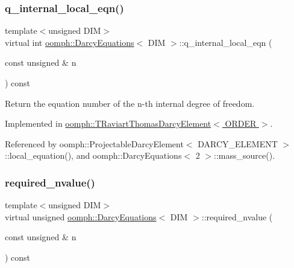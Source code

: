 \subsubsection{\texorpdfstring{q\+\_\+internal\+\_\+local\+\_\+eqn()}{q\_internal\_local\_eqn()}}
{\footnotesize\ttfamily template$<$unsigned D\+IM$>$ \\
virtual int \hyperlink{classoomph_1_1DarcyEquations}{oomph\+::\+Darcy\+Equations}$<$ D\+IM $>$\+::q\+\_\+internal\+\_\+local\+\_\+eqn (\begin{DoxyParamCaption}\item[{const unsigned \&}]{n }\end{DoxyParamCaption}) const\hspace{0.3cm}{\ttfamily [pure virtual]}}



Return the equation number of the n-\/th internal degree of freedom. 



Implemented in \hyperlink{classoomph_1_1TRaviartThomasDarcyElement_a9c2b450d0dc3ce6a683409f2e82b8589}{oomph\+::\+T\+Raviart\+Thomas\+Darcy\+Element$<$ O\+R\+D\+E\+R $>$}.



Referenced by oomph\+::\+Projectable\+Darcy\+Element$<$ D\+A\+R\+C\+Y\+\_\+\+E\+L\+E\+M\+E\+N\+T $>$\+::local\+\_\+equation(), and oomph\+::\+Darcy\+Equations$<$ 2 $>$\+::mass\+\_\+source().

\mbox{\label{classoomph_1_1DarcyEquations_a05d86d0d0568c5f90e6d735730798571}} 
\subsubsection{\texorpdfstring{required\+\_\+nvalue()}{required\_nvalue()}}
{\footnotesize\ttfamily template$<$unsigned D\+IM$>$ \\
virtual unsigned \hyperlink{classoomph_1_1DarcyEquations}{oomph\+::\+Darcy\+Equations}$<$ D\+IM $>$\+::required\+\_\+nvalue (\begin{DoxyParamCaption}\item[{const unsigned \&}]{n }\end{DoxyParamCaption}) const\hspace{0.3cm}{\ttfamily [pure virtual]}}



